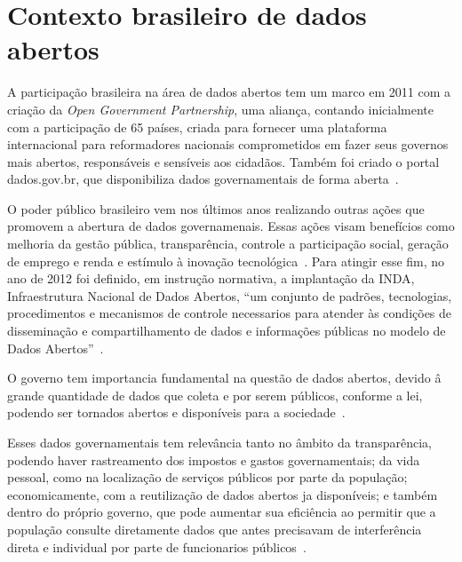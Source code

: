 \section{Contexto brasileiro de dados abertos}
A participação brasileira na área de dados abertos tem um marco em 2011 com a criação da \emph{Open Government Partnership}, uma aliança, contando inicialmente com a participação de 65 países, criada para fornecer uma plataforma internacional para reformadores nacionais comprometidos em fazer seus governos mais abertos, responsáveis e sensíveis aos cidadãos. Também foi criado o portal dados.gov.br, que disponibiliza dados governamentais de forma aberta~\cite{seijiconectados}.

O poder público brasileiro vem nos últimos anos realizando outras ações que promovem a abertura de dados governamenais. Essas ações visam benefícios como melhoria da gestão pública, transparência, controle a participação social, geração de emprego e renda e estímulo à inovação tecnológica~\cite{tcu}. Para atingir esse fim, no ano de 2012 foi definido, em instrução normativa, a implantação da INDA, Infraestrutura Nacional de Dados Abertos, \enquote{um conjunto de padrões, tecnologias, procedimentos e mecanismos de controle necessarios para atender às condições de disseminação e compartilhamento de dados e informações públicas no modelo de Dados Abertos}~\cite{inda}.  

O governo tem importancia fundamental na questão de dados abertos, devido â grande quantidade de dados que coleta e por serem públicos, conforme a lei, podendo ser tornados abertos e disponíveis para a sociedade~\cite{openknowledge}.

Esses dados governamentais tem relevância tanto no âmbito da transparência, podendo haver rastreamento dos impostos e gastos governamentais; da vida pessoal, como na localização de serviços públicos por parte da população; economicamente, com a reutilização de dados abertos ja disponíveis; e também dentro do próprio governo, que pode aumentar sua eficiência ao permitir que a população consulte diretamente dados que antes precisavam de interferência direta e individual por parte de funcionarios públicos~\cite{openknowledge}.









